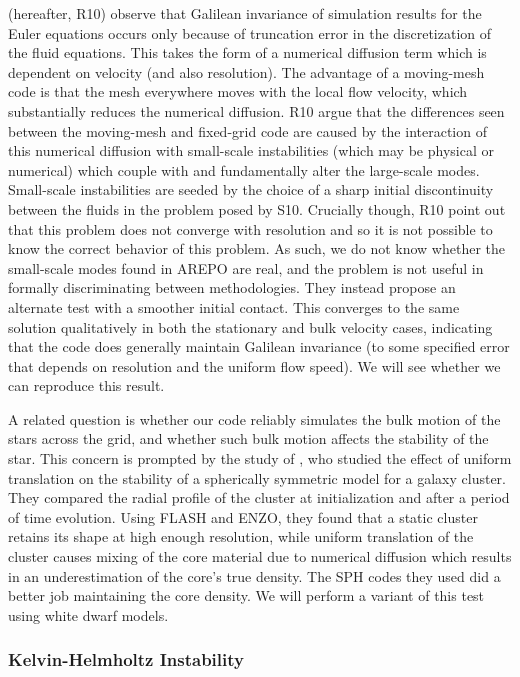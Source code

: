 \documentclass[iop]{../emulateapj}
\begin{document}
\citet{robertson:2010} (hereafter, R10) observe that Galilean
invariance of simulation results for the Euler equations occurs only
because of truncation error in the discretization of the fluid
equations. This takes the form of a numerical diffusion term which is
dependent on velocity (and also resolution). The advantage of a
moving-mesh code is that the mesh everywhere moves with the local flow
velocity, which substantially reduces the numerical
diffusion. R10 argue that the differences seen
between the moving-mesh and fixed-grid code are caused by the
interaction of this numerical diffusion with small-scale instabilities
(which may be physical or numerical) which couple with and
fundamentally alter the large-scale modes. Small-scale instabilities
are seeded by the choice of a sharp initial discontinuity between the 
fluids in the problem posed by S10. Crucially though,
R10 point out that this problem does not
converge with resolution and so it is not possible to know the correct
behavior of this problem. As such, we do not know whether the
small-scale modes found in AREPO are real, and the problem is not
useful in formally discriminating between methodologies. They instead
propose an alternate test with a smoother initial contact. This
converges to the same solution qualitatively in both the stationary
and bulk velocity cases, indicating that the code does generally
maintain Galilean invariance (to some specified error that depends on
resolution and the uniform flow speed).  We will see whether we can
reproduce this result.

A related question is whether our code reliably simulates the bulk
motion of the stars across the grid, and whether such bulk motion
affects the stability of the star. This concern is prompted by the
study of \cite{tasker:2008}, who studied the effect of uniform
translation on the stability of a spherically symmetric model for a
galaxy cluster. They compared the radial profile of the cluster at
initialization and after a period of time evolution. Using FLASH and
ENZO, they found that a static cluster retains its shape at high
enough resolution, while uniform translation of the cluster causes
mixing of the core material due to numerical diffusion which results
in an underestimation of the core's true density. The SPH codes they
used did a better job maintaining the core density. We will perform a
variant of this test using white dwarf models.

\subsubsection{Kelvin-Helmholtz Instability}\label{sec:khi}
\end{document}
